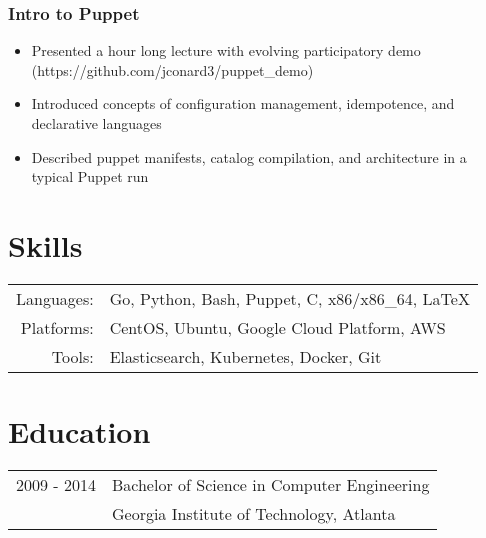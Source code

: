 \documentclass[letterpaper]{article}
\begin{document}
\subsubsection*{Intro to Puppet}
\begin{itemize}[noitemsep]
	\item Presented a hour long lecture with evolving participatory demo (https://github.com/jconard3/puppet\_demo)
	\item Introduced concepts of configuration management, idempotence, and declarative languages
	\item Described puppet manifests, catalog compilation, and architecture in a typical Puppet run
\end{itemize}

\section*{Skills}
\begin{tabular}{rl}
    Languages: & Go, Python, Bash, Puppet, C, x86/x86\_64, \LaTeX\\
    Platforms: & CentOS, Ubuntu, Google Cloud Platform, AWS\\
    Tools: & Elasticsearch, Kubernetes, Docker, Git\\
\end{tabular}

\section*{Education}
\begin{tabular}{rl}
    2009 - 2014 & Bachelor of Science in {Computer Engineering}\\
    & {Georgia Institute of Technology}, Atlanta\\
\end{tabular}
\end{document}
